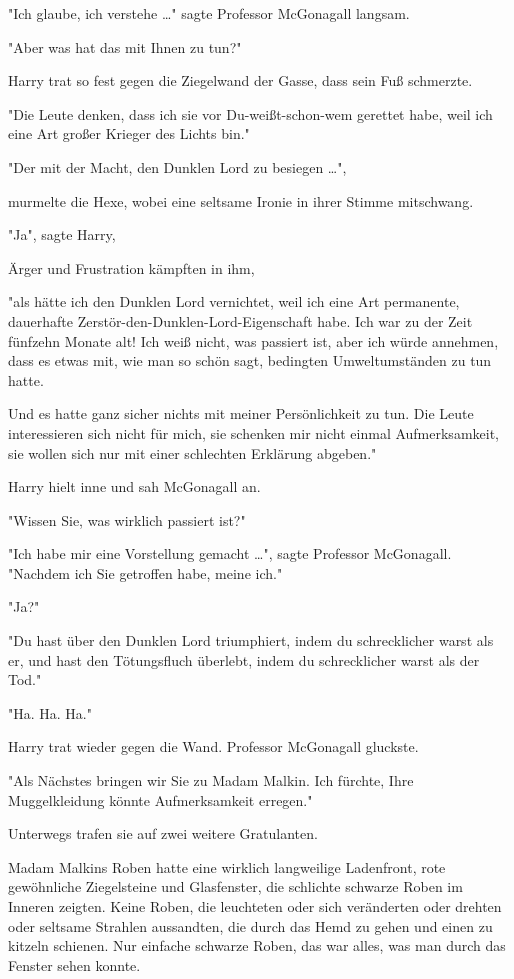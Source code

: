 {"Ich glaube, ich verstehe …" sagte Professor McGonagall langsam.

"Aber was hat das mit Ihnen zu tun?"

Harry trat so fest gegen die Ziegelwand der Gasse, dass sein Fuß schmerzte.

"Die Leute denken, dass ich sie vor Du-weißt-schon-wem gerettet habe, weil ich eine Art großer Krieger des Lichts bin."

"Der mit der Macht, den Dunklen Lord zu besiegen …",

murmelte die Hexe, wobei eine seltsame Ironie in ihrer Stimme mitschwang.

"Ja", sagte Harry,

Ärger und Frustration kämpften in ihm,

"als hätte ich den Dunklen Lord vernichtet, weil ich eine Art permanente, dauerhafte Zerstör-den-Dunklen-Lord-Eigenschaft habe. Ich war zu der Zeit fünfzehn Monate alt! Ich weiß nicht, was passiert ist, aber ich würde annehmen, dass es etwas mit, wie man so schön sagt, bedingten Umweltumständen zu tun hatte.

Und es hatte ganz sicher nichts mit meiner Persönlichkeit zu tun. Die Leute interessieren sich nicht für mich, sie schenken mir nicht einmal Aufmerksamkeit, sie wollen sich nur mit einer schlechten Erklärung abgeben."

Harry hielt inne und sah McGonagall an.

"Wissen Sie, was wirklich passiert ist?"

"Ich habe mir eine Vorstellung gemacht …", sagte Professor McGonagall. "Nachdem ich Sie getroffen habe, meine ich."

"Ja?"

"Du hast über den Dunklen Lord triumphiert, indem du schrecklicher warst als er, und hast den Tötungsfluch überlebt, indem du schrecklicher warst als der Tod."

"Ha. Ha. Ha."

Harry trat wieder gegen die Wand. Professor McGonagall gluckste.

"Als Nächstes bringen wir Sie zu Madam Malkin. Ich fürchte, Ihre Muggelkleidung könnte Aufmerksamkeit erregen."

Unterwegs trafen sie auf zwei weitere Gratulanten.

Madam Malkins Roben hatte eine wirklich langweilige Ladenfront, rote gewöhnliche Ziegelsteine und Glasfenster, die schlichte schwarze Roben im Inneren zeigten. Keine Roben, die leuchteten oder sich veränderten oder drehten oder seltsame Strahlen aussandten, die durch das Hemd zu gehen und einen zu kitzeln schienen. Nur einfache schwarze Roben, das war alles, was man durch das Fenster sehen konnte.

}
